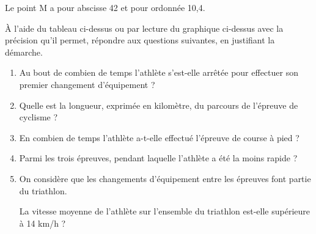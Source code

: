 Le point M a pour abscisse 42 et pour ordonnée 10,4.
	
À l’aide du tableau ci-dessus ou par lecture du graphique ci-dessus avec la précision qu’il permet, répondre aux questions suivantes, en justifiant la démarche.

\medskip
	
	\begin{enumerate}
		\item Au bout de combien de temps l’athlète s’est-elle arrêtée pour effectuer son premier changement d'équipement ?
		
		\item Quelle est la longueur, exprimée en kilomètre, du parcours de l'épreuve de cyclisme ?
		
		\item En combien de temps l’athlète a-t-elle effectué l'épreuve de course à pied ?
		
		\item Parmi les trois épreuves, pendant laquelle l’athlète a été la moins rapide ?
		
		\item On considère que les changements d'équipement entre les épreuves font partie du triathlon.
		
		La vitesse moyenne de l’athlète sur l’ensemble du triathlon est-elle supérieure à 14 km/h ?
	\end{enumerate}
	
	
